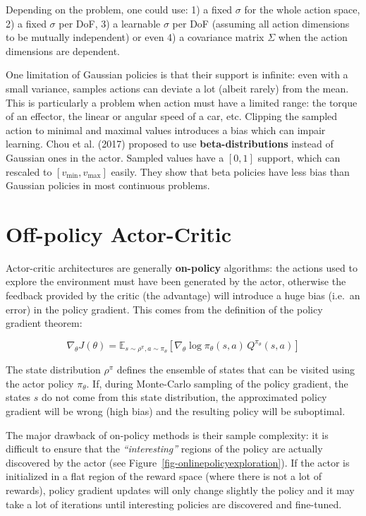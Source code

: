 \documentclass[
  letterpaper,
  DIV=11,
  numbers=noendperiod]{scrreprt}
\begin{document}
Depending on the problem, one could use: 1) a fixed \(\sigma\) for the
whole action space, 2) a fixed \(\sigma\) per DoF, 3) a learnable
\(\sigma\) per DoF (assuming all action dimensions to be mutually
independent) or even 4) a covariance matrix \(\Sigma\) when the action
dimensions are dependent.

One limitation of Gaussian policies is that their support is infinite:
even with a small variance, samples actions can deviate a lot (albeit
rarely) from the mean. This is particularly a problem when action must
have a limited range: the torque of an effector, the linear or angular
speed of a car, etc. Clipping the sampled action to minimal and maximal
values introduces a bias which can impair learning. Chou et al. (2017)
proposed to use \textbf{beta-distributions} instead of Gaussian ones in
the actor. Sampled values have a \([0,1]\) support, which can rescaled
to \([v_\text{min},v_\text{max}]\) easily. They show that beta policies
have less bias than Gaussian policies in most continuous problems.


\hypertarget{off-policy-actor-critic}{%
\chapter{Off-policy Actor-Critic}\label{off-policy-actor-critic}}

Actor-critic architectures are generally \textbf{on-policy} algorithms:
the actions used to explore the environment must have been generated by
the actor, otherwise the feedback provided by the critic (the advantage)
will introduce a huge bias (i.e.~an error) in the policy gradient. This
comes from the definition of the policy gradient theorem:

\[
    \nabla_\theta J(\theta) =  \mathbb{E}_{s \sim \rho^\pi, a \sim \pi_\theta}[\nabla_\theta \log \pi_\theta(s, a) \, Q^{\pi_\theta}(s, a)]
\]

The state distribution \(\rho^\pi\) defines the ensemble of states that
can be visited using the actor policy \(\pi_\theta\). If, during
Monte-Carlo sampling of the policy gradient, the states \(s\) do not
come from this state distribution, the approximated policy gradient will
be wrong (high bias) and the resulting policy will be suboptimal.

The major drawback of on-policy methods is their sample complexity: it
is difficult to ensure that the \emph{``interesting''} regions of the
policy are actually discovered by the actor (see
Figure~\ref{fig-onlinepolicyexploration}). If the actor is initialized
in a flat region of the reward space (where there is not a lot of
rewards), policy gradient updates will only change slightly the policy
and it may take a lot of iterations until interesting policies are
discovered and fine-tuned.
\end{document}
